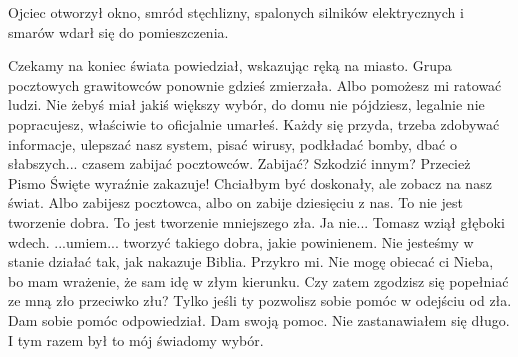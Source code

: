 Ojciec otworzył okno, smród stęchlizny, spalonych silników elektrycznych i smarów wdarł się do pomieszczenia.

\begin{dialogue}
\ds{} Czekamy na koniec świata \dm{} powiedział, wskazując ręką na miasto. Grupa pocztowych grawitowców ponownie gdzieś zmierzała. \dm{}
Albo pomożesz mi ratować ludzi. Nie żebyś miał jakiś większy wybór, do domu nie pójdziesz, legalnie nie popracujesz, właściwie to oficjalnie umarłeś. 
Każdy się przyda, trzeba zdobywać informacje, ulepszać nasz system, pisać wirusy, podkładać bomby, dbać o słabszych... czasem zabijać pocztowców. 
\ds{} Zabijać? Szkodzić innym? Przecież Pismo Święte wyraźnie zakazuje!
\ds{} Chciałbym być doskonały, ale zobacz na nasz świat.
Albo zabijesz pocztowca, albo on zabije dziesięciu z nas. 
To nie jest tworzenie dobra. To jest tworzenie mniejszego zła.
Ja nie... \dm{} Tomasz wziął głęboki wdech. \dm{} ...umiem... tworzyć takiego dobra, jakie powinienem.
Nie jesteśmy w stanie działać tak, jak nakazuje Biblia. Przykro mi.
Nie mogę obiecać ci Nieba, bo mam wrażenie, że sam idę w złym kierunku. Czy zatem zgodzisz się popełniać ze mną zło przeciwko złu? 
\ds{} Tylko jeśli ty pozwolisz sobie pomóc w odejściu od zła.
\ds{} Dam sobie pomóc \dm{} odpowiedział.
\ds{} Dam swoją pomoc. \dm{} Nie zastanawiałem się długo. I tym razem był to mój świadomy wybór.
\end{dialogue}



